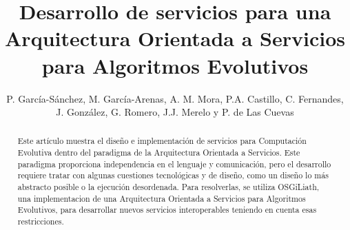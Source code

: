 \documentclass[runningheads]{llncs}
\begin{document}
\mainmatter  %



\title{Desarrollo de servicios para una Arquitectura Orientada a Servicios para Algoritmos Evolutivos}


\author{P. García-Sánchez, M. García-Arenas, A. M. Mora, P.A. Castillo, C. Fernandes, J. González, G. Romero, J.J. Merelo y P. de Las Cuevas}

%







\maketitle
\thispagestyle{empty}
\pagestyle{empty}
\begin{abstract}
Este artículo muestra el diseño e implementación de servicios para
Computación Evolutiva dentro del paradigma de la Arquitectura
Orientada a Servicios. Este paradigma proporciona independencia en el
lenguaje y comunicación, pero el desarrollo requiere tratar con
algunas cuestiones tecnológicas y de diseño, como un diseño lo más
abstracto posible o la ejecución desordenada. Para resolverlas, se utiliza
OSGiLiath, una implementacion de una Arquitectura Orientada a
Servicios para Algoritmos Evolutivos, para desarrollar nuevos
servicios interoperables teniendo en cuenta esas restricciones. %

\end{abstract}
\end{document}
